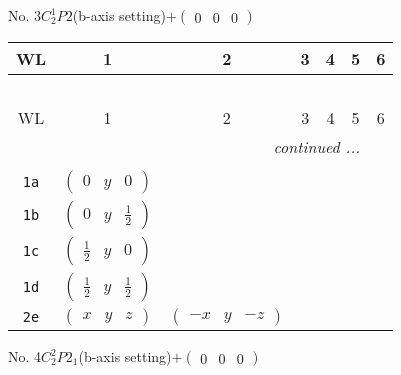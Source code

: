 \documentclass[fleqn,9pt,landscape]{jsarticle}
\begin{document}
\newpage
No. 3\quad$C_{2}^{1}$\quad$P2$\quad(b-axis setting)\quad[ monoclinic ]\quad$+\begin{pmatrix} 0 & 0 & 0 \end{pmatrix}$
\begin{center}
\renewcommand{\arraystretch}{1.2}
\begin{longtable}{ccccccc}
 \hline \hline
WL & 1 & 2 & 3 & 4 & 5 & 6 \\ \hline \endfirsthead

\multicolumn{6}{l}{\tablename\ \thetable{}} \\
 \hline \hline
WL & 1 & 2 & 3 & 4 & 5 & 6 \\ \hline \endhead

 \hline \hline
\multicolumn{6}{r}{\footnotesize\it continued ...} \\ \endfoot

 \hline \hline
\multicolumn{6}{r}{} \\ \endlastfoot

{\tt 1a} & $ \begin{pmatrix} 0 & y & 0 \end{pmatrix} $ & $  $ \\ \hline
{\tt 1b} & $ \begin{pmatrix} 0 & y & \frac{1}{2} \end{pmatrix} $ & $  $ \\ \hline
{\tt 1c} & $ \begin{pmatrix} \frac{1}{2} & y & 0 \end{pmatrix} $ & $  $ \\ \hline
{\tt 1d} & $ \begin{pmatrix} \frac{1}{2} & y & \frac{1}{2} \end{pmatrix} $ & $  $ \\ \hline
{\tt 2e} & $ \begin{pmatrix} x & y & z \end{pmatrix} $ & $ \begin{pmatrix} - x & y & - z \end{pmatrix} $ \\
\end{longtable}
\end{center}
\newpage
No. 4\quad$C_{2}^{2}$\quad$P2_1$\quad(b-axis setting)\quad[ monoclinic ]\quad$+\begin{pmatrix} 0 & 0 & 0 \end{pmatrix}$
\end{document}
